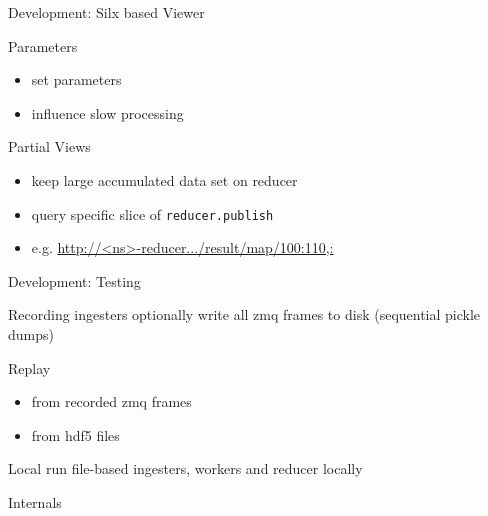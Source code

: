 \documentclass[aspectratio=169]{beamer}
\begin{document}
\begin{frame}{Development: Silx based Viewer}
 \begin{block}{Parameters}
 \begin{itemize}
  \item set parameters
  \item influence slow processing
 \end{itemize}
 \end{block}

 \begin{block}{Partial Views}
  \begin{itemize}
   \item keep large accumulated data set on reducer
   \item query specific slice of \texttt{reducer.publish}
   \item e.g. \url{http://<ns>-reducer.../result/map/100:110,:}
  \end{itemize}
 \end{block}


\end{frame}


\begin{frame}{Development: Testing}
 \begin{block}{Recording}
  ingesters optionally write all zmq frames to disk (sequential pickle dumps)
 \end{block}

\begin{block}{Replay}
\begin{itemize}
 \item from recorded zmq frames
 \item from hdf5 files
\end{itemize}
\end{block}

\begin{block}{Local}
 run file-based ingesters, workers and reducer locally
\end{block}

\end{frame}

\begin{frame}
 \centering
 \Huge {} Internals
\end{frame}
\end{document}

